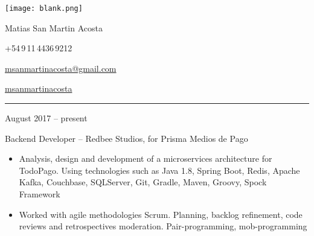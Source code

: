 \documentclass[a4paper,10pt]{article}
\newlength{\cvcolumngapwidth}
\newlength{\cvleftcolumnwidth}
\newlength{\cvrightcolumnwidth}
\newcommand{\cvnamestyle}[1]{{\Large\cvnamefont\textcolor{cvnamecolor}{#1}}}
\newcommand{\cvsectionstyle}[1]{{\normalsize\cvsectionfont\textcolor{cvsectioncolor}{#1}}}
\newcommand{\cvtitlestyle}[1]{{\large\cvtitlefont\textcolor{cvtitlecolor}{#1}}}
\newcommand{\cvdurationstyle}[1]{{\small\cvdurationfont\textcolor{cvdurationcolor}{#1}}}
\newlength{\cvafteritemskipamount}
\newlength{\cvaftersectionskipamount}
\newlength{\cvafternameskipamount}
\newlength{\cvafterpersonalinfolineskipamount}
\newlength{\cvaftertitleskipamount}
\newlength{\cvparskip}
\newcommand{\cvpersonalinfo}[2]{
    \begin{minipage}[t]{\cvleftcolumnwidth}
       \vspace{0mm} %
       \raggedleft #1
    \end{minipage}%
    \hspace{\cvcolumngapwidth}%
    \begin{minipage}[t]{\cvrightcolumnwidth}
        \vspace{0mm} %
        #2
    \end{minipage}

    \vspace{\cvafteritemskipamount}
}
\newcommand{\cvname}[1]{
    \cvnamestyle{#1}

    \vspace{\cvafternameskipamount}
}
\newcommand{\cvpersonalinfolinewithicon}[3]{
    #3
    \raisebox{.5\fontcharht\font`E-.5\height}{\texttt{[image: \#2]}}
    

    \vspace{\cvafterpersonalinfolineskipamount}
}
\newcommand{\cvsection}[1]{
    \begin{minipage}[t]{\cvleftcolumnwidth}
        \raggedleft\cvsectionstyle{#1}
    \end{minipage}%
    \hspace{\cvcolumngapwidth}%
    \begin{minipage}[t]{\cvrightcolumnwidth}
        \textcolor{cvrulecolor}{\rule{\cvrightcolumnwidth}{0.6mm}}
    \end{minipage}

    \vspace{\cvaftersectionskipamount}
}
\newcommand{\cvitem}[2]{
    \begin{minipage}[t]{\cvleftcolumnwidth}
        \raggedleft #1
    \end{minipage}%
    \hspace{\cvcolumngapwidth}%
    \begin{minipage}[t]{\cvrightcolumnwidth}
        \setlength{\parskip}{\cvparskip} #2
    \end{minipage}

    \vspace{\cvafteritemskipamount}
}
\newcommand{\cvtitle}[1]{
    \cvtitlestyle{#1}

    \vspace{\cvaftertitleskipamount}
    \vspace{-\cvparskip}
}
\newcommand{\emptyline}{\vspace{1mm}}
\begin{document}

\cvpersonalinfo{
    \texttt{[image: blank.png]}
}{
    \cvname{\hspace*{\fill}Matias San Martin Acosta}


    \hspace*{\fill}\cvpersonalinfolinewithicon{height=4mm}{067-phone.pdf}{
    +54\,9\,11\,4436\,9212
    }

    \hspace*{\fill}\cvpersonalinfolinewithicon{height=4mm}{070-envelop.pdf}{
        \href{mailto:msanmartinacosta@gmail.com}{msanmartinacosta@gmail.com}
    }

    \hspace*{\fill}\cvpersonalinfolinewithicon{height=4mm}{458-linkedin.pdf}{
       \href{https://www.linkedin.com/in/msanmartinacosta}{msanmartinacosta}
    }

}



\cvsection{WORK EXPERIENCE}

\cvitem{
    \cvdurationstyle{August 2017 -- present}
}{
    \cvtitle{Backend Developer -- \normalsize Redbee Studios, for Prisma Medios de Pago} \emptyline

    \begin{itemize}[leftmargin=*]
    
        \item Analysis, design and development of a microservices architecture for TodoPago. Using technologies such as Java 1.8, Spring Boot, Redis, Apache Kafka, Couchbase, SQLServer, Git, Gradle, Maven, Groovy, Spock Framework \emptyline
        
        \item Worked with agile methodologies Scrum. Planning, backlog refinement, code reviews and retrospectives moderation. Pair-programming, mob-programming \emptyline
        
    \end{itemize}
}
\end{document}
